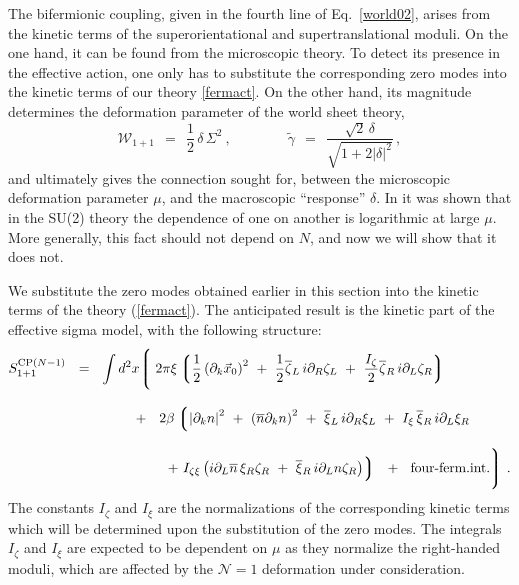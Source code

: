 \documentclass[12pt]{article}
\newcommand{\none}{${\mathcal N}=1$ }
\newcommand{\p}{\partial}
\newcommand{\wt}{\widetilde}
\newcommand{\ov}{\overline}
\newcommand{\lgr}{\left\lgroup}
\newcommand{\rgr}{\right\rgroup}
\newcommand{\tgamma}{\wt{\gamma}}
\begin{document}
	The bifermionic coupling, given in the fourth line of Eq.~\eqref{world02}, arises from the 
	kinetic terms of the superorientational and supertranslational moduli.
	On the one hand, it can be found from the microscopic theory. 
	To detect its presence in the effective action, one only has to substitute the corresponding zero modes 
	into the kinetic terms of our theory \eqref{fermact}.
	On the other hand, its magnitude determines the deformation parameter  of the world sheet theory, 
\[
	\mathcal{W}_{1+1} ~~=~~ \frac{1}{2}\,\delta\,\Sigma^2~,
	\qquad\qquad
	\tgamma ~~=~~ \frac { \sqrt{2}\,\delta } { \sqrt{ 1 +  2 |\delta|^2 } }\,,
\]
	and ultimately gives the connection sought for, between the microscopic deformation parameter $ \mu $, and 
	the macroscopic ``response'' $ \delta $.
	In \cite{SYhet} it was shown that in the SU(2) theory the dependence of one on another is logarithmic at large 
	$ \mu $.
	More generally, this fact should not depend on $ N $, and now we will show that it does not.

	We substitute the zero modes obtained earlier in this section into the kinetic terms of the theory
	(\ref{fermact}).
	The anticipated result is the kinetic part of the effective sigma model, with the following structure:
\begin{align}
%
\label{world_unnorm}
	S_{\rm 1+1}^{{\rm CP}(N-1)} ~~=~~  \int d^2x 
	\Biggl\lgroup\; 
	&
		2\pi\xi \lgr   \frac{1}{2} \left(\p_k \vec{x}_0 \right)^2
				~+~  \frac{1}{2} \ov{\zeta}{}_L\, i\p_R \zeta_L 
				~+~  \frac{I_\zeta}{2} \ov{\zeta}{}_R\, i\p_L \zeta_R
			\rgr
	\\[3mm]
%
\notag
	~~+~~  
	&\;
	2\beta \lgr \left|\p_k n \right|^2  ~+~ \left(\ov{n}\p_k n\right)^2  
		~+~ \ov{\xi}{}_L\, i\p_R \xi_L  ~+~  I_\xi\, \ov{\xi}{}_R\, i\p_L  \xi_R
		\right .
	\\[3mm]
%
\notag
	&\;
		\left. 
		~+~ I_{\zeta\xi} 
			\left(  i\p_L\ov{n}\, \xi_R \zeta_R ~+~  \ov{\xi}{}_R \, i\p_L n \zeta_R \right)
	 \rgr
	~~+~~  \text{four-ferm.int.}
	\Biggr\rgroup ~.
\end{align}
	The constants  $ I_\zeta $ and $ I_\xi $ are the normalizations
	of the corresponding kinetic terms which will be determined upon the substitution of the
	zero modes.
	The integrals $ I_\zeta $ and $ I_\xi $ are expected to be dependent on $ \mu $ as they
	normalize the right-handed moduli, which are affected by the \none deformation
	under consideration.
\end{document}
